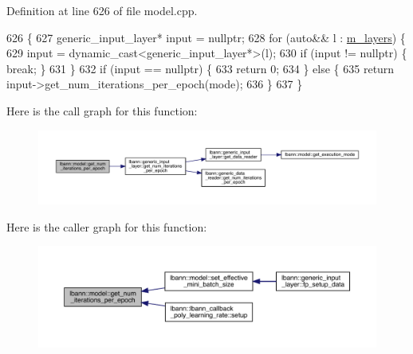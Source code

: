 Definition at line 626 of file model.\+cpp.


\begin{DoxyCode}
626                                                                  \{
627   generic\_input\_layer* input = \textcolor{keyword}{nullptr};
628   \textcolor{keywordflow}{for} (\textcolor{keyword}{auto}&& l : \hyperlink{classlbann_1_1model_a0229fc226ec163d1411548446104569d}{m\_layers}) \{
629     input = \textcolor{keyword}{dynamic\_cast<}generic\_input\_layer*\textcolor{keyword}{>}(l);
630     \textcolor{keywordflow}{if} (input != \textcolor{keyword}{nullptr}) \{ \textcolor{keywordflow}{break}; \}
631   \}
632   \textcolor{keywordflow}{if} (input == \textcolor{keyword}{nullptr}) \{
633     \textcolor{keywordflow}{return} 0;
634   \} \textcolor{keywordflow}{else} \{
635     \textcolor{keywordflow}{return} input->get\_num\_iterations\_per\_epoch(mode);
636   \}
637 \}
\end{DoxyCode}
Here is the call graph for this function\+:\nopagebreak
\begin{figure}[H]
\begin{center}
\leavevmode
\includegraphics[width=350pt]{classlbann_1_1model_a32a189033b8ff92d233781b1039c70f1_cgraph}
\end{center}
\end{figure}
Here is the caller graph for this function\+:\nopagebreak
\begin{figure}[H]
\begin{center}
\leavevmode
\includegraphics[width=350pt]{classlbann_1_1model_a32a189033b8ff92d233781b1039c70f1_icgraph}
\end{center}
\end{figure}
\mbox{\label{classlbann_1_1model_aee5530467523924a662dec891b9a7993}} 
